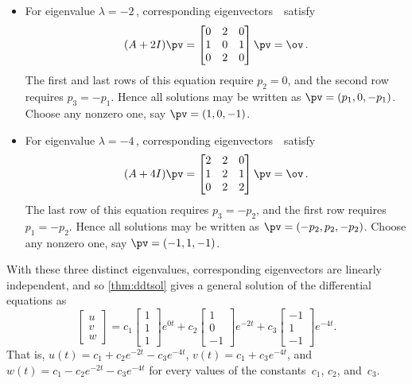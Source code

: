 \begin{example}
\begin{solution}
\begin{itemize}
\item For eigenvalue \(\lambda=-2\)\,, corresponding eigenvectors~\pv\ satisfy
\begin{equation*}
(A+2I)\pv=\begin{bmatrix} 0&2&0\\1&0&1\\0&2&0 \end{bmatrix}\pv=\ov\,.
\end{equation*}
The first and last rows of this equation require \(p_2=0\), and the second row requires \(p_3=-p_1\).
Hence all solutions may be written as \(\pv=(p_1,0,-p_1)\).
Choose any nonzero one, say \(\pv=(1,0,-1)\).

\item For eigenvalue \(\lambda=-4\)\,, corresponding eigenvectors~\pv\ satisfy
\begin{equation*}
(A+4I)\pv=\begin{bmatrix} 2&2&0\\1&2&1\\0&2&2 \end{bmatrix}\pv=\ov\,.
\end{equation*}
The last row of this equation requires \(p_3=-p_2\), and the first row requires \(p_1=-p_2\).
Hence all solutions may be written as \(\pv=(-p_2,p_2,-p_2)\).
Choose any nonzero one, say \(\pv=(-1,1,-1)\).

\end{itemize}
With these three distinct eigenvalues, corresponding eigenvectors are linearly independent, and so \cref{thm:ddtsol} gives a general solution of the differential equations as
\begin{equation*}
\begin{bmatrix} u\\v\\w \end{bmatrix}
=c_1\begin{bmatrix} 1\\1\\1 \end{bmatrix}e^{0t}
+c_2\begin{bmatrix} 1\\0\\-1 \end{bmatrix}e^{-2t}
+c_3\begin{bmatrix} -1\\1\\-1 \end{bmatrix}e^{-4t}.
\end{equation*}
That is, \(u(t)=c_1+c_2e^{-2t}-c_3e^{-4t}\), \(v(t)=c_1+c_3e^{-4t}\), and \(w(t)=c_1-c_2e^{-2t}-c_3e^{-4t}\) for every values of the constants~\(c_1\), \(c_2\), and~\(c_3\).
\end{solution}
\end{example}





